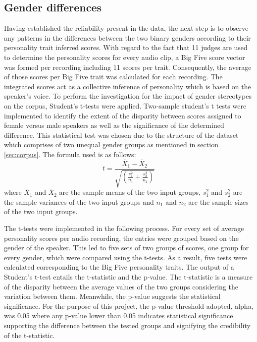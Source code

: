 \documentclass{l4proj}
\begin{document}
\subsection{Gender differences}\label{sec:Gender_differences}
Having established the reliability present in the data, the next step is to observe any patterns in the differences between the two binary genders according to their personality trait inferred scores. With regard to the fact that 11 judges are used to determine the personality scores for every audio clip, a Big Five score vector was formed per recording including 11 scores per trait. Consequently, the average of those scores per Big Five trait was calculated for each recording. 
The integrated scores act as a collective inference of personality which is based on the speaker’s voice.
To perform the investigation for the impact of gender stereotypes on the corpus, Student’s t-tests were applied. Two-sample student’s t tests were implemented to identify the extent of the disparity between scores assigned to female versus male speakers as well as the significance of the determined difference. 
This statistical test was chosen due to the structure of the dataset which comprises of two unequal gender groups as mentioned in section \ref{sec:corpus}.
The formula used is as follows:
\begin{equation}
t = \frac{\bar{X}_1 - \bar{X}_2}{\sqrt{\left(\frac{s^2_1}{n_1} + \frac{s^2_2}{n_2}\right)}}
\end{equation}
where $\bar{X}_1$ and $\bar{X}_2$ are the sample means of the two input groups, ${s^2_1}$ and ${s^2_2}$ are the sample variances of the two input groups and $n_1$ and $n_2$ are the sample sizes of the two input groups.

The t-tests were implemented in the following process. 
For every set of average personality scores per audio recording, the entries were grouped based on the gender of the speaker. This led to five sets of two groups of scores, one group for every gender, which were compared using the t-tests. As a result, five tests were calculated corresponding to the Big Five personality traits. 
The output of a Student’s t-test entails the t-statistic and the p-value. The t-statistic is a measure of the disparity between the average values of the two groups considering the variation between them. Meanwhile, the p-value suggests the statistical significance. For the purpose of this project, the p-value threshold adopted, alpha, was 0.05 where any p-value lower than 0.05 indicates statistical significance supporting the difference between the tested groups and signifying the credibility of the t-statistic.
\end{document}
